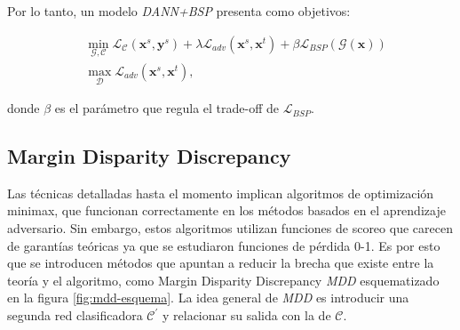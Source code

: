 Por lo tanto, un modelo {\it DANN+BSP} presenta como objetivos:

\begin{align}
   & \min_{\mathcal{G},\mathcal{C}} \mathcal{L}_\mathcal{C}(\mathbf{x}^s, \mathbf{y}^s) + \lambda \mathcal{L}_{adv}(\mathbf{x}^s, \mathbf{x}^t) + \beta \mathcal{L}_{BSP}(\mathcal{G}(\mathbf{x})) \\
   & \max_{\mathcal{D}} \mathcal{L}_{adv}(\mathbf{x}^s, \mathbf{x}^t),
  \label{eq:bsp-dann-obejtivo}
\end{align}

\noindent
donde $\beta$ es el parámetro que regula el trade-off de $\mathcal{L}_{BSP}$.

\subsection{Margin Disparity Discrepancy}

Las técnicas detalladas hasta el momento implican algoritmos de optimización minimax, que funcionan correctamente en
los métodos basados en el aprendizaje adversario. Sin embargo, estos algoritmos utilizan funciones de scoreo que
carecen de garantías teóricas ya que se estudiaron funciones de pérdida 0-1. Es por esto que se introducen métodos que
apuntan a reducir la brecha que existe entre la teoría y el algoritmo, como Margin Disparity Discrepancy {\it MDD} \parencite{zhang2019bridging} esquematizado en la figura \ref{fig:mdd-esquema}. La idea general de {\it MDD} es introducir
una segunda red clasificadora $\mathcal{C}^{'}$ y relacionar su salida con la de $\mathcal{C}$.

